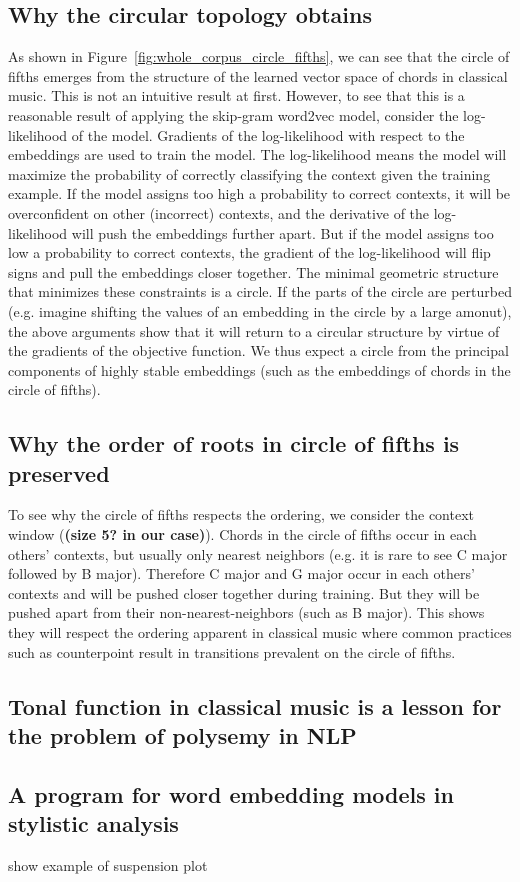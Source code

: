 
\subsection{Why the circular topology obtains}
As shown in Figure~\ref{fig:whole_corpus_circle_fifths}, we can see that the circle of fifths emerges from the structure of the learned vector space of chords in classical music.
This is not an intuitive result at first.
However, to see that this is a reasonable result of applying the skip-gram word2vec model, consider the log-likelihood of the model.
Gradients of the log-likelihood with respect to the embeddings are used to train the model.
The log-likelihood means the model will maximize the probability of correctly classifying the context given the training example.
If the model assigns too high a probability to correct contexts, it will be overconfident on other (incorrect) contexts, and the derivative of the log-likelihood will push the embeddings further apart.
But if the model assigns too low a probability to correct contexts, the gradient of the log-likelihood will flip signs and pull the embeddings closer together.
The minimal geometric structure that minimizes these constraints is a circle. If the parts of the circle are perturbed (e.g. imagine shifting the values of an embedding in the circle by a large amonut), the above arguments show that it will return to a circular structure by virtue of the gradients of the objective function.
We thus expect a circle from the principal components of highly stable embeddings (such as the embeddings of chords in the circle of fifths).
\subsection{Why the order of roots in circle of fifths is preserved}
To see why the circle of fifths respects the ordering, we consider the context window (\textbf{(size 5? in our case)}).
Chords in the circle of fifths occur in each others' contexts, but usually only nearest neighbors (e.g. it is rare to see C major followed by B major).
Therefore C major and G major occur in each others' contexts and will be pushed closer together during training.
But they will be pushed apart from their non-nearest-neighbors (such as B major). This shows they will respect the ordering apparent in classical music where common practices such as counterpoint result in transitions prevalent on the circle of fifths.
\subsection{Tonal function in classical music is a lesson for the problem of polysemy in NLP}
\subsection{A program for word embedding models in stylistic analysis}
show example of suspension plot
